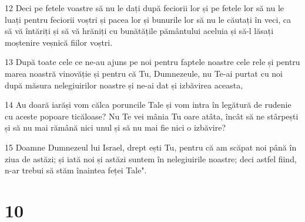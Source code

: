 \par 12 Deci pe fetele voastre să nu le dați după feciorii lor și pe fetele lor să nu le luați pentru feciorii voștri și pacea lor și bunurile lor să nu le căutați în veci, ca să vă întăriți și să vă hrăniți cu bunătățile pământului aceluia și să-l lăsați moștenire veșnică fiilor voștri.
\par 13 După toate cele ce ne-au ajuns pe noi pentru faptele noastre cele rele și pentru marea noastră vinovăție și pentru că Tu, Dumnezeule, nu Te-ai purtat cu noi după măsura nelegiuirilor noastre și ne-ai dat și izbăvirea aceasta,
\par 14 Au doară iarăși vom călca poruncile Tale și vom intra în legătură de rudenie cu aceste popoare ticăloase? Nu Te vei mânia Tu oare atâta, încât să ne stârpești și să nu mai rămână nici unul și să nu mai fie nici o izbăvire?
\par 15 Doamne Dumnezeul lui Israel, drept ești Tu, pentru că am scăpat noi până în ziua de astăzi; și iată noi și astăzi suntem în nelegiuirile noastre; deci astfel fiind, n-ar trebui să stăm înaintea feței Tale".

\chapter{10}

